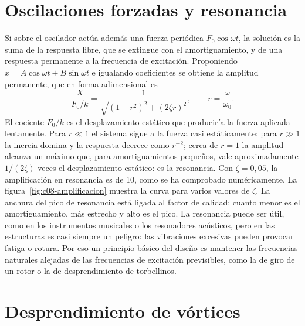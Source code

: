 \documentclass[10pt,openany]{book}
\begin{document}
\section{Oscilaciones forzadas y resonancia}

Si sobre el oscilador actúa además una fuerza periódica \(F_0\cos\omega t\), la solución es la suma de la respuesta libre, que se extingue con el amortiguamiento, y de una respuesta permanente a la frecuencia de excitación. Proponiendo \(x = A\cos\omega t + B\sin\omega t\) e igualando coeficientes se obtiene la amplitud permanente, que en forma adimensional es
\begin{equation}
\frac{X}{F_0/k} = \frac{1}{\sqrt{\left(1 - r^{2}\right)^{2} + \left(2\zeta r\right)^{2}}}, \qquad r = \frac{\omega}{\omega_0}. \label{eq:c08-forzada}
\end{equation}
El cociente \(F_0/k\) es el desplazamiento estático que produciría la fuerza aplicada lentamente. Para \(r \ll 1\) el sistema sigue a la fuerza casi estáticamente; para \(r \gg 1\) la inercia domina y la respuesta decrece como \(r^{-2}\); cerca de \(r = 1\) la amplitud alcanza un máximo que, para amortiguamientos pequeños, vale aproximadamente \(1/(2\zeta)\) veces el desplazamiento estático: es la resonancia. Con \(\zeta = 0{,}05\), la amplificación en resonancia es de 10, como se ha comprobado numéricamente. La figura~\ref{fig:c08-amplificacion} muestra la curva para varios valores de \(\zeta\). La anchura del pico de resonancia está ligada al factor de calidad: cuanto menor es el amortiguamiento, más estrecho y alto es el pico. La resonancia puede ser útil, como en los instrumentos musicales o los resonadores acústicos, pero en las estructuras es casi siempre un peligro: las vibraciones excesivas pueden provocar fatiga o rotura. Por eso un principio básico del diseño es mantener las frecuencias naturales alejadas de las frecuencias de excitación previsibles, como la de giro de un rotor o la de desprendimiento de torbellinos.

\section{Desprendimiento de vórtices}
\end{document}
